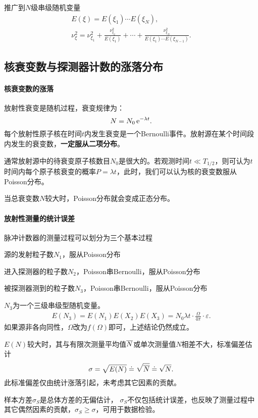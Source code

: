 推广到$N$级串级随机变量
\begin{gather*}
	E(\xi)=E(\xi_1)\cdots E(\xi_N),\\
	\nu_\xi^2=\nu_{\xi_1}^2+\frac{\nu_{\xi_2}^2}{E(\xi_1)}+\cdots+\frac{\nu_{\xi_N}^2}{E(\xi_1)\cdots E(\xi_{N-1})}.
\end{gather*}
\subsection{核衰变数与探测器计数的涨落分布}
\paragraph{核衰变数的涨落}
放射性衰变是随机过程，衰变规律为：
\[
	N=N_0\mathop{}\!\mathrm{e}^{-\lambda t}.
\]
每个放射性原子核在时间$t$内发生衰变是一个Bernoulli事件。放射源在某个时间段内发生的衰变数，\textbf{一定服从二项分布}。

通常放射源中的待衰变原子核数目$N_0$是很大的。若观测时间$t\ll T_{1/2}$，则可认为$t$时间内每个原子核衰变的概率$P=\lambda t$，此时，我们可以认为核的衰变数服从Poisson分布。

当总衰变数$ N $较大时，Poisson分布就会变成正态分布。
\paragraph{放射性测量的统计误差}
脉冲计数器的测量过程可以划分为三个基本过程
\begin{compactitem}
	\item 源的发射粒子数$N_1$，服从Poisson分布
	\item 进入探测器的粒子数$N_2$，Poisson串Bernoulli，服从Poisson分布
	\item 被探测器测到的粒子数$N_3$，Poisson串Bernoulli，服从Poisson分布
\end{compactitem}
$N_3$为一个三级串级型随机变量。
\begin{align}\label{detector-expect}
	E(N_3)=E(N_1)E(X_2)E(X_3)=N_0\lambda t\cdot\frac{\Omega}{4\pi}\cdot\varepsilon.
\end{align}
如果源非各向同性，$\Omega$改为$f(\Omega)$即可，上述结论仍然成立。%

$E(N)$较大时，其与有限次测量平均值$\overline N$或单次测量值$N$相差不大，标准偏差估计
\[
	\sigma=\sqrt{E(N)}\doteq\sqrt{\overline N}\doteq\sqrt N.
\]
此标准偏差仅由统计涨落引起，未考虑其它因素的贡献。

样本方差$\sigma_S$是总体方差的无偏估计，%
$\sigma_S$不仅包括统计误差，也反映了测量过程中其它偶然因素的贡献，$\sigma_S\geqslant\sigma$，可用于数据检验。


